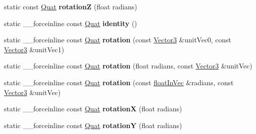 \begin{DoxyCompactItemize}
\item 
\hypertarget{classVectormath_1_1Aos_1_1Quat_a7bc308b781629e197acb388b0e40a725}{static const \hyperlink{classVectormath_1_1Aos_1_1Quat}{Quat} {\bfseries rotation\-Z} (float radians)}\label{classVectormath_1_1Aos_1_1Quat_a7bc308b781629e197acb388b0e40a725}

\item 
\hypertarget{classVectormath_1_1Aos_1_1Quat_a5a9fc193593f3a83f4ea1ee3821e0855}{static \-\_\-\-\_\-forceinline const \hyperlink{classVectormath_1_1Aos_1_1Quat}{Quat} {\bfseries identity} ()}\label{classVectormath_1_1Aos_1_1Quat_a5a9fc193593f3a83f4ea1ee3821e0855}

\item 
\hypertarget{classVectormath_1_1Aos_1_1Quat_a8e85bb10f00341b5cad405d503e12c24}{static \-\_\-\-\_\-forceinline const \hyperlink{classVectormath_1_1Aos_1_1Quat}{Quat} {\bfseries rotation} (const \hyperlink{classVectormath_1_1Aos_1_1Vector3}{Vector3} \&unit\-Vec0, const \hyperlink{classVectormath_1_1Aos_1_1Vector3}{Vector3} \&unit\-Vec1)}\label{classVectormath_1_1Aos_1_1Quat_a8e85bb10f00341b5cad405d503e12c24}

\item 
\hypertarget{classVectormath_1_1Aos_1_1Quat_a8fb0950311ad5f25879b9fa06f33279d}{static \-\_\-\-\_\-forceinline const \hyperlink{classVectormath_1_1Aos_1_1Quat}{Quat} {\bfseries rotation} (float radians, const \hyperlink{classVectormath_1_1Aos_1_1Vector3}{Vector3} \&unit\-Vec)}\label{classVectormath_1_1Aos_1_1Quat_a8fb0950311ad5f25879b9fa06f33279d}

\item 
\hypertarget{classVectormath_1_1Aos_1_1Quat_a8ac94258b46851f676d09fe0545e73fd}{static \-\_\-\-\_\-forceinline const \hyperlink{classVectormath_1_1Aos_1_1Quat}{Quat} {\bfseries rotation} (const \hyperlink{classVectormath_1_1floatInVec}{float\-In\-Vec} \&radians, const \hyperlink{classVectormath_1_1Aos_1_1Vector3}{Vector3} \&unit\-Vec)}\label{classVectormath_1_1Aos_1_1Quat_a8ac94258b46851f676d09fe0545e73fd}

\item 
\hypertarget{classVectormath_1_1Aos_1_1Quat_a699d7f0452dd1a46c1f41bea0e2a513b}{static \-\_\-\-\_\-forceinline const \hyperlink{classVectormath_1_1Aos_1_1Quat}{Quat} {\bfseries rotation\-X} (float radians)}\label{classVectormath_1_1Aos_1_1Quat_a699d7f0452dd1a46c1f41bea0e2a513b}

\item 
\hypertarget{classVectormath_1_1Aos_1_1Quat_ae2d2a48ce93d95e4132e60c509e76235}{static \-\_\-\-\_\-forceinline const \hyperlink{classVectormath_1_1Aos_1_1Quat}{Quat} {\bfseries rotation\-Y} (float radians)}\label{classVectormath_1_1Aos_1_1Quat_ae2d2a48ce93d95e4132e60c509e76235}


\end{DoxyCompactItemize}
